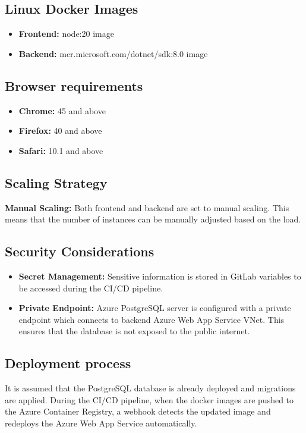 \documentclass[
    english, %
]{VUMIFPSkursinis}
\begin{document}
\subsection{Linux Docker Images}
\begin{itemize}
    \item \textbf{Frontend:} node:20 image
    \item \textbf{Backend:} mcr.microsoft.com/dotnet/sdk:8.0 image
\end{itemize}

\subsection{Browser requirements}
\begin{itemize}
    \item \textbf{Chrome:} 45 and above
    \item \textbf{Firefox:} 40 and above
    \item \textbf{Safari:} 10.1 and above
\end{itemize}

\subsection{Scaling Strategy}
\textbf{Manual Scaling:} Both frontend and backend are set to manual scaling. This means that the number of instances can be manually adjusted based on the load.

\subsection{Security Considerations}
\begin{itemize}
    \item \textbf{Secret Management:} Sensitive information is stored in GitLab variables to be accessed during the CI/CD pipeline.
    \item \textbf{Private Endpoint:} Azure PostgreSQL server is configured with a private endpoint which connects to backend Azure Web App Service VNet. This ensures that the database is not exposed to the public internet.
\end{itemize}

\subsection{Deployment process}

It is assumed that the PostgreSQL database is already deployed and migrations are applied. During the CI/CD pipeline, when the docker images are pushed to the Azure Container Registry, a webhook detects the updated image and redeploys the Azure Web App Service automatically.
\end{document}
